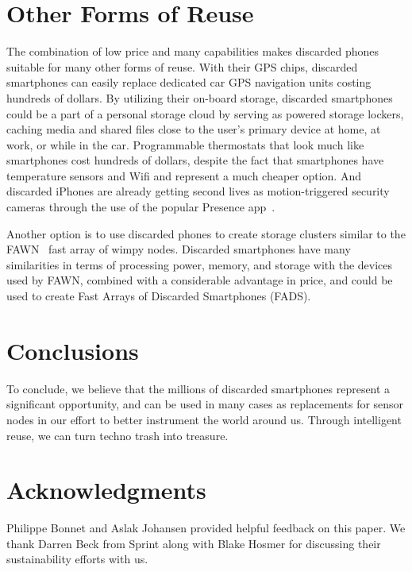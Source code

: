 \section{Other Forms of Reuse}
\label{sec-other}

The combination of low price and many capabilities makes discarded phones
suitable for many other forms of reuse. With their GPS chips, discarded
smartphones can easily replace dedicated car GPS navigation units costing
hundreds of dollars. By utilizing their on-board storage, discarded
smartphones could be a part of a personal storage cloud by serving as powered
storage lockers, caching media and shared files close to the user's primary
device at home, at work, or while in the car. Programmable thermostats that
look much like smartphones cost hundreds of dollars, despite the fact that
smartphones have temperature sensors and Wifi and represent a much cheaper
option. And discarded iPhones are already getting second lives as
motion-triggered security cameras through the use of the popular Presence
app~\cite{presence-peoplepower}.

Another option is to use discarded phones to create storage clusters similar
to the FAWN~\cite{fawn} fast array of wimpy nodes. Discarded smartphones have
many similarities in terms of processing power, memory, and storage with the
devices used by FAWN, combined with a considerable advantage in price, and
could be used to create Fast Arrays of Discarded Smartphones (FADS).

\section{Conclusions}
\label{sec-conclusion}

To conclude, we believe that the millions of discarded smartphones represent
a significant opportunity, and can be used in many cases as replacements for
sensor nodes in our effort to better instrument the world around us. Through
intelligent reuse, we can turn techno trash into treasure.

\section*{Acknowledgments}

Philippe Bonnet and Aslak Johansen provided helpful feedback on this paper.
We thank Darren Beck from Sprint along with Blake Hosmer for discussing their
sustainability efforts with us.
